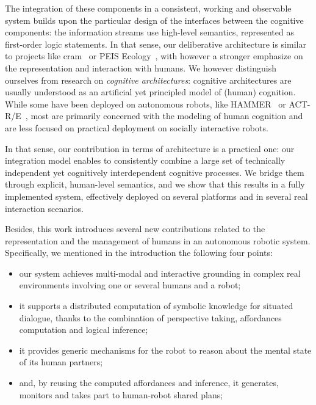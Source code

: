 \documentclass[preprint,3p,times]{elsarticle}
\begin{document}
The integration of these components in a consistent, working and observable
system builds upon the particular design of the interfaces between the
cognitive components: the information streams use high-level semantics,
represented as first-order logic statements. In that sense, our deliberative
architecture is similar to projects like {\sc cram}~\cite{Beetz2010} or PEIS
Ecology~\cite{saffiotti2005peis, daoutis2012cooperative}, with however a
stronger emphasize on the representation and interaction with humans. We
however distinguish ourselves from research on \emph{cognitive architectures}:
cognitive architectures are usually understood as an artificial yet principled
model of (human) cognition. While some have been deployed on autonomous robots,
like HAMMER~\cite{demiris2006hierarchical} or ACT-R/E~\cite{trafton2013act},
most are primarily concerned with the modeling of human cognition and are less
focused on practical deployment on socially interactive robots.

In that sense, our contribution in terms of architecture is a practical one:
our integration model enables to consistently combine a large set of
technically independent yet cognitively interdependent cognitive processes. We
bridge them through explicit, human-level semantics, and we show that this
results in a fully implemented system, effectively deployed on several
platforms and in several real interaction scenarios.

Besides, this work introduces several new contributions related to the
representation and the management of humans in an autonomous robotic system.
Specifically, we mentioned in the introduction the following four points:

\begin{itemize}

	\item our system achieves multi-modal and interactive grounding in complex
		real environments involving one or several humans and a robot;

	\item it supports a distributed computation of symbolic knowledge for
		situated dialogue, thanks to the combination of perspective taking,
		affordances computation and logical inference;

	\item it provides generic mechanisms for the robot to reason about the mental state
		of its human partners;

	\item and, by reusing the computed affordances and inference, it generates,
		monitors and takes part to human-robot shared plans;

\end{itemize}
\end{document}
